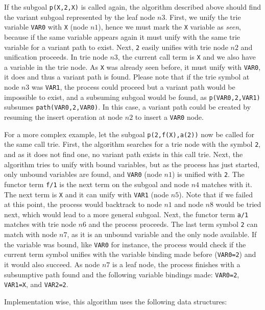 If the subgoal \texttt{p(X,2,X)} is called again, the algorithm described above
should find the variant subgoal represented by the leaf node $n3$. First, we unify the trie variable
\texttt{VAR0} with \texttt{X} (node $n1$), hence we must mark the \texttt{X} variable as \textit{seen},
because if the same variable appears again it must unify with the same trie variable for a variant path
to exist. Next, \texttt{2} easily unifies with trie node $n2$ and unification proceeds. In trie node $n3$,
the current call term is \texttt{X} and we also have a variable in the trie node. As \texttt{X} was already seen before,
it must unify with \texttt{VAR0}, it does and thus a variant path is found. Please note that if
the trie symbol at node $n3$ was \texttt{VAR1}, the process could proceed but a variant path would be impossible
to exist, and a subsuming subgoal would be found, as \texttt{p(VAR0,2,VAR1)} subsumes \texttt{path(VAR0,2,VAR0)}.
In this case, a variant path could be created by resuming the insert operation at node $n2$ to insert
a \texttt{VAR0} node.

For a more complex example, let the subgoal \texttt{p(2,f(X),a(2))} now be called for the same call trie. First,
the algorithm searches for a trie node with the symbol \texttt{2}, and as it does not find one, no variant path
exists in this call trie. Next, the algorithm tries to unify with bound variables, but as the process
has just started, only unbound variables are found, and \texttt{VAR0} (node $n1$) is unified with \texttt{2}.
The functor term \texttt{f/1} is the next term on the subgoal and node $n4$ matches with it.
The next term is \texttt{X} and it can unify with \texttt{VAR1} (node $n5$).
Note that if we failed at this point, the process would backtrack to node $n1$ and node $n8$
would be tried next, which would lead to a more general subgoal.
Next, the functor term \texttt{a/1} matches with trie node $n6$ and the process proceeds.
The last term symbol \texttt{2} can match with node $n7$, as it is an unbound variable
and the only node available.
If the variable was bound, like \texttt{VAR0} for instance,
the process would check if the current term symbol unifies with the variable binding made before (\texttt{VAR0=2}) and
it would also succeed. As node $n7$ is a leaf node, the process finishes with a subsumptive path found and
the following variable bindings made: \texttt{VAR0=2}, \texttt{VAR1=X}, and \texttt{VAR2=2}.

Implementation wise, this algorithm uses the following data structures:

